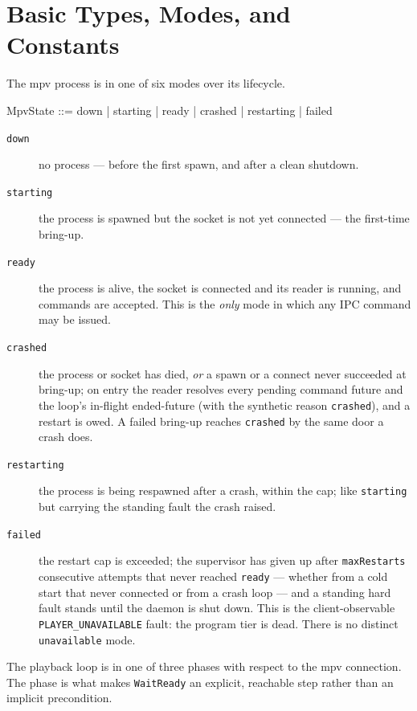 \documentclass[a4paper,10pt,fleqn]{article}
\begin{document}
\section{Basic Types, Modes, and Constants}
\label{sec:types}

The mpv process is in one of six modes over its lifecycle.

\begin{zed}
  MpvState ::= down | starting | ready | crashed | restarting | failed
\end{zed}

\begin{description}
  \item[\texttt{down}] no process --- before the first spawn, and after a
    clean shutdown.
  \item[\texttt{starting}] the process is spawned but the socket is not yet
    connected --- the first-time bring-up.
  \item[\texttt{ready}] the process is alive, the socket is connected and its
    reader is running, and commands are accepted. This is the \emph{only} mode
    in which any IPC command may be issued.
  \item[\texttt{crashed}] the process or socket has died, \emph{or} a spawn or a
    connect never succeeded at bring-up; on entry the reader resolves every
    pending command future and the loop's in-flight ended-future (with the
    synthetic reason \texttt{crashed}), and a restart is owed. A failed bring-up
    reaches \texttt{crashed} by the same door a crash does.
  \item[\texttt{restarting}] the process is being respawned after a crash,
    within the cap; like \texttt{starting} but carrying the standing fault the
    crash raised.
  \item[\texttt{failed}] the restart cap is exceeded; the supervisor has given
    up after \texttt{maxRestarts} consecutive attempts that never reached
    \texttt{ready} --- whether from a cold start that never connected or from a
    crash loop --- and a standing hard fault stands until the daemon is shut
    down. This is the client-observable \texttt{PLAYER\_UNAVAILABLE} fault: the
    program tier is dead. There is no distinct \texttt{unavailable} mode.
\end{description}

The playback loop is in one of three phases with respect to the mpv connection.
The phase is what makes \texttt{WaitReady} an explicit, reachable step rather
than an implicit precondition.
\end{document}
